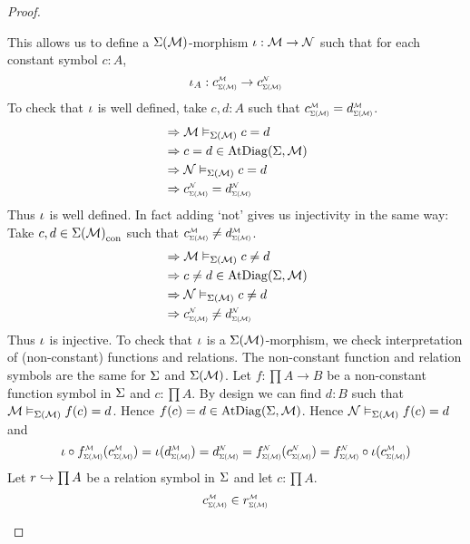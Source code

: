 \begin{proof}
\begin{forward}
        This allows us to define a $\Sigma(\mathcal{M})$-morphism 
        $\iota : \mathcal{M} \to \mathcal{N}$ such that for each constant symbol $c : A$,
        \[\io_A : \subintp{\Si(\MM)}{\MM}{c} \to \subintp{\Si(\MM)}{\NN}{c}\]
        To check that $\iota$ is well defined, 
        take $c,d : A$ such that 
        $\subintp{\Si(\MM)}{\MM}{c} = \subintp{\Si(\MM)}{\MM}{d}$.
        \begin{align*}
            &\implies \MM \model{\Si(\MM)} c = d \\
            &\implies c = d \in \atdiag{\Si}{\MM} \\
            &\implies \NN \model{\Si(\MM)} c = d \\
            &\implies \subintp{\Si(\MM)}{\NN}{c} = \subintp{\Si(\MM)}{\NN}{d}
        \end{align*}
        Thus $\iota$ is well defined.
        In fact adding `not' gives us injectivity in the same way:
        Take $c,d \in {\Sigma(\mathcal{M})}_\mathrm{con}$ such that 
        $\subintp{\Si(\MM)}{\MM}{c} \ne \subintp{\Si(\MM)}{\MM}{d}$.
        \begin{align*}
            &\implies \MM \model{\Si(\MM)} c \ne d \\
            &\implies c \ne d \in \atdiag{\Si}{\MM} \\
            &\implies \NN \model{\Si(\MM)} c \ne d \\
            &\implies \subintp{\Si(\MM)}{\NN}{c} \ne \subintp{\Si(\MM)}{\NN}{d}
        \end{align*}
        Thus $\iota$ is injective.
        To check that $\iota$ is a $\Sigma(\mathcal{M})$-morphism, 
        we check interpretation of (non-constant) functions and relations.
        The non-constant function and relation symbols are the same 
        for $\Sigma$ and $\Sigma(\mathcal{M})$.
        Let $f : \prod A \to B$ be a non-constant function symbol in $\Sigma$
        and $c : \prod A$.
        By design we can find 
        $d : B$ such that $\mathcal{M} \vDash_{\Sigma(\mathcal{M})} f(c) = d$.
        Hence $f(c) = d \in \mathrm{AtDiag}(\Sigma,\mathcal{M})$.
        Hence $\mathcal{N} \vDash_{\Sigma(\mathcal{M})} f(c) = d$ and   
        \[
            \io \circ \subintp{\Si(\MM)}{\MM}{f}(\subintp{\Si(\MM)}{\MM}{c}) 
            = \io(\subintp{\Si(\MM)}{\MM}{d}) 
            = \subintp{\Si(\MM)}{\NN}{d}
            = \subintp{\Si(\MM)}{\NN}{f}(\subintp{\Si(\MM)}{\NN}{c})
            = \subintp{\Si(\MM)}{\NN}{f} \circ \io(\subintp{\Si(\MM)}{\MM}{c})
        \]
        Let $r \hookrightarrow \prod A$ be a relation symbol in $\Sigma$ and let 
        $c : \prod A$.
        \begin{align*}
            \subintp{\Si(\MM)}{\MM}{c}\in \subintp{\Si(\MM)}{\MM}{r} 

\end{align*}
\end{forward}
\end{proof}
